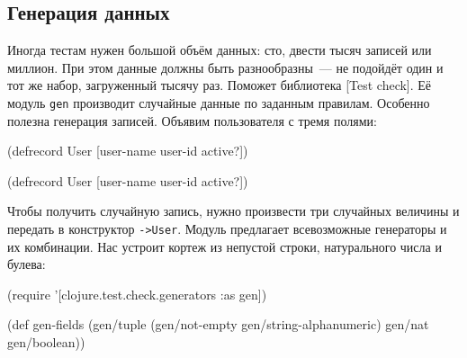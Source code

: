 \else

\begin{english}
\end{english}

\fi

\subsection{Генерация данных}


Иногда тестам нужен большой объём данных: сто, двести тысяч записей или
миллион. При этом данные должны быть разнообразны~--- не подойдёт один и тот же
набор, загруженный тысячу раз. Поможет библиотека
[Test check].
Её модуль \verb|gen| производит случайные данные по заданным правилам. Особенно
полезна генерация записей. Объявим пользователя с тремя полями:

\ifnarrow

\begin{english}
  \begin{clojure}
(defrecord User
  [user-name user-id active?])
  \end{clojure}
\end{english}

\else

\begin{english}
  \begin{clojure}
(defrecord User [user-name user-id active?])
  \end{clojure}
\end{english}

\fi

Чтобы получить случайную запись, нужно произвести три случайных величины и
передать в конструктор \verb|->User|. Модуль предлагает всевозможные генераторы
и их комбинации. Нас устроит кортеж из непустой строки, натурального числа и
булева:

\pagebreaklarge

\ifnarrow

\begin{english}
  \begin{clojure}
(require
 '[clojure.test.check.generators
   :as gen])

(def gen-fields
  (gen/tuple
    (gen/not-empty
      gen/string-alphanumeric)
    gen/nat
    gen/boolean))
  \end{clojure}
\end{english}

